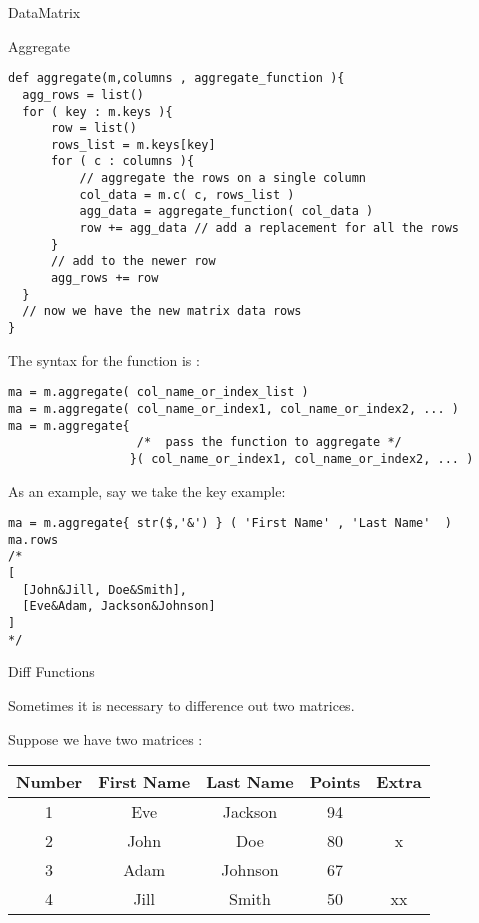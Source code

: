 \begin{section}{DataMatrix}
\begin{subsection}{Aggregate}
\begin{lstlisting}[style=JexlStyle]
def aggregate(m,columns , aggregate_function ){
  agg_rows = list()
  for ( key : m.keys ){
      row = list()
      rows_list = m.keys[key]  
      for ( c : columns ){
          // aggregate the rows on a single column
          col_data = m.c( c, rows_list ) 
          agg_data = aggregate_function( col_data )
          row += agg_data // add a replacement for all the rows   
      }
      // add to the newer row
      agg_rows += row 
  }
  // now we have the new matrix data rows
}
\end{lstlisting}

The syntax for the function is :

\begin{lstlisting}[style=JexlStyle]
ma = m.aggregate( col_name_or_index_list )
ma = m.aggregate( col_name_or_index1, col_name_or_index2, ... )
ma = m.aggregate{ 
                  /*  pass the function to aggregate */  
                 }( col_name_or_index1, col_name_or_index2, ... )
\end{lstlisting}

As an example, say we take the key example:

\begin{lstlisting}[style=JexlStyle]
ma = m.aggregate{ str($,'&') } ( 'First Name' , 'Last Name'  )
ma.rows 
/* 
[ 
  [John&Jill, Doe&Smith], 
  [Eve&Adam, Jackson&Johnson]
] 
*/
\end{lstlisting}
\end{subsection}


\begin{subsection}{Diff Functions}

Sometimes it is necessary to difference out two matrices.

Suppose we have two matrices :

\begin{center}\label{matrix-diff}

\begin{tabular}{ |c|c|c|c|c| } 
 \hline
 Number	& First Name & Last Name & Points & Extra \\ 
 \hline 
   1    & Eve	     & Jackson	& 94      & \\
   2    & John       &  Doe	    & 80      &  x \\ 
   3    & Adam       & Johnson	& 67      &  \\	
   4    & Jill       & Smith	& 50      & xx \\  
 \hline  
\end{tabular}


\end{center}
\end{subsection}
\end{section}
